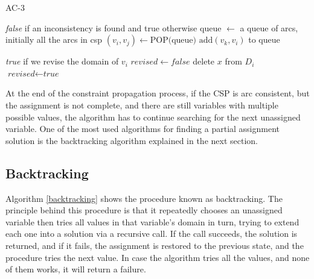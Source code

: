 \begin{algorithm}
\caption{AC-3} \label{modifiedminibatch}
\begin{algorithmic}[1]
 \Return \textit{false} if an inconsistency is found and true otherwise
\State queue $\gets$ a queue of arcs, initially all the arcs in csp
\State $(v_i, v_j) \gets \text{POP(queue)}$
\EndIf
{}
\State $\text{add} (v_k, v_i)$ to queue
\EndFor
\EndIf
\EndWhile
\State {}
\EndFunction
\end{algorithmic}

\begin{algorithmic}[1]
 \Return \textit{true} if we revise the domain of $v_i$
\State $revised \gets \textit{false}$
\State delete $x$ from $D_i$
\State $\textit{revised} \gets \textit{true}$
\EndIf
\EndFor
\State {}
\EndFunction
\end{algorithmic}
\end{algorithm}

At the end of the constraint propagation process, if the CSP is arc consistent,
but the assignment is not complete, and there are still variables with multiple
possible values, the algorithm has to continue searching for the next unassigned
variable. One of the most used algorithms for finding a partial assignment
solution is the backtracking algorithm explained in the next section.

\subsection{Backtracking}
Algorithm \ref{backtracking} shows the procedure known as backtracking. The
principle behind this procedure is that it repeatedly chooses an unassigned
variable then tries all values in that variable's domain in turn, trying to
extend each one into a solution via a recursive call. If the call succeeds, the
solution is returned, and if it fails, the assignment is restored to the
previous state, and the procedure tries the next value. In case the algorithm
tries all the values, and none of them works, it will return a failure.

